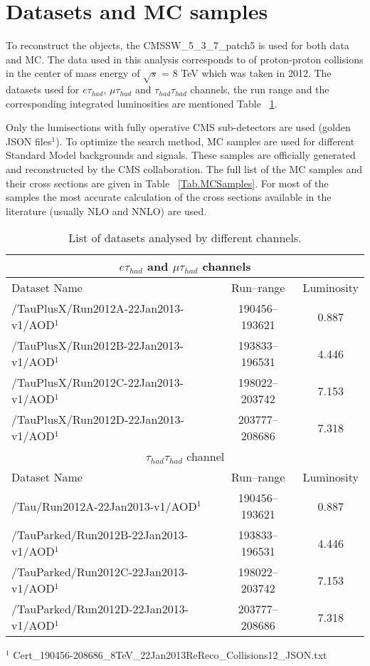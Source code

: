 \section{Datasets and MC samples}
\label{sect:dataMC}
To reconstruct the objects, the CMSSW\_5\_3\_7\_patch5 is used for both data and MC.
The data used in this analysis corresponds to \IL of proton-proton collisions in the center of mass energy of $\sqrt{s}$ = 8 TeV 
which was taken in 2012. The datasets used for $e\tau_{had}$, $\mu\tau_{had}$ and $\tau_{had}\tau_{had}$ channels, the run range and the corresponding integrated luminosities are mentioned Table ~\ref{Tab.DataSamples}.

Only the lumisections with fully operative CMS sub-detectors are used (golden JSON files$^{1}$). To optimize the search method, MC 
samples are used for different Standard Model backgrounds and signals. These samples are officially generated and reconstructed by the CMS
collaboration. The full list of the MC samples and their cross sections are given in Table ~\ref{Tab.MCSamples}. For most of the samples the most 
accurate calculation of the cross sections available in the literature (usually NLO and NNLO) are used. 



\begin{table}[!h]

\begin{center}
\small{
\begin{tabular}{|l|c|c|}
\hline
\multicolumn{3}{|c|}{$e\tau_{had}$ and $\mu\tau_{had}$ channels} \\
\hline
Dataset Name & Run--range & Luminosity \\
\hline
/TauPlusX/Run2012A-22Jan2013-v1/AOD$^{1}$   & 190456--193621 & 0.887\\
/TauPlusX/Run2012B-22Jan2013-v1/AOD$^{1}$   & 193833--196531 & 4.446\\
/TauPlusX/Run2012C-22Jan2013-v1/AOD$^{1}$   & 198022--203742 & 7.153\\
/TauPlusX/Run2012D-22Jan2013-v1/AOD$^{1}$   & 203777--208686 & 7.318\\
\hline
\hline
\multicolumn{3}{|c|}{$\tau_{had}\tau_{had}$ channel} \\
\hline
Dataset Name & Run--range & Luminosity \\
\hline
/Tau/Run2012A-22Jan2013-v1/AOD$^{1}$   & 190456--193621 & 0.887 \\
/TauParked/Run2012B-22Jan2013-v1/AOD$^{1}$ & 193833--196531 & 4.446 \\
/TauParked/Run2012C-22Jan2013-v1/AOD$^{1}$ & 198022--203742 & 7.153 \\
/TauParked/Run2012D-22Jan2013-v1/AOD$^{1}$ & 203777--208686 & 7.318 \\
\hline

\end{tabular}
}
\end{center}
$^{1}$ Cert\_190456-208686\_8TeV\_22Jan2013ReReco\_Collisions12\_JSON.txt \\
\caption{
  List of datasets analysed by different channels.
}
\label{Tab.DataSamples}
\end{table}


